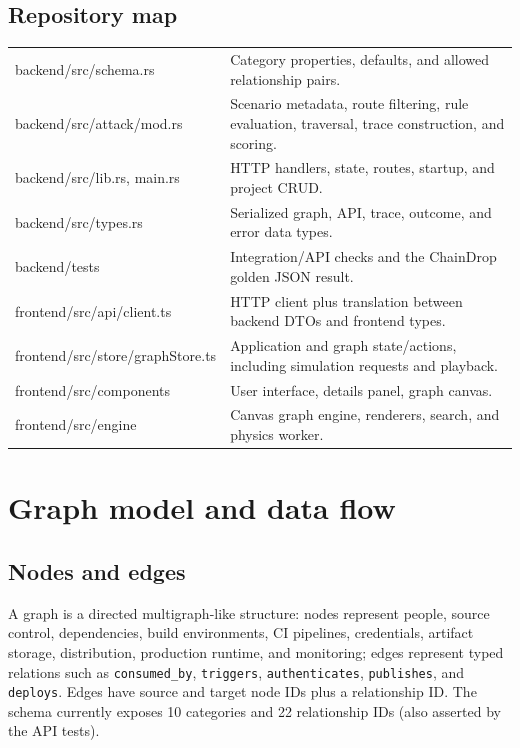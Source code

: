 \documentclass[11pt,oneside]{book}
\newcommand{\code}[1]{\texttt{\small #1}}
\begin{document}
\section{Repository map}
\begin{center}\begin{tabularx}{\textwidth}{>{\ttfamily}p{} X}\toprule
backend/src/schema.rs & Category properties, defaults, and allowed relationship pairs.\\
backend/src/attack/mod.rs & Scenario metadata, route filtering, rule evaluation, traversal, trace construction, and scoring.\\
backend/src/lib.rs, main.rs & HTTP handlers, state, routes, startup, and project CRUD.\\
backend/src/types.rs & Serialized graph, API, trace, outcome, and error data types.\\
backend/tests & Integration/API checks and the ChainDrop golden JSON result.\\
frontend/src/api/client.ts & HTTP client plus translation between backend DTOs and frontend types.\\
frontend/src/store/graphStore.ts & Application and graph state/actions, including simulation requests and playback.\\
frontend/src/components & User interface, details panel, graph canvas.\\
frontend/src/engine & Canvas graph engine, renderers, search, and physics worker.\\
\bottomrule\end{tabularx}\end{center}

\chapter{Graph model and data flow}
\section{Nodes and edges}
A graph is a directed multigraph-like structure: nodes represent people, source control, dependencies, build environments, CI pipelines, credentials, artifact storage, distribution, production runtime, and monitoring; edges represent typed relations such as \code{consumed\_by}, \code{triggers}, \code{authenticates}, \code{publishes}, and \code{deploys}. Edges have source and target node IDs plus a relationship ID. The schema currently exposes 10 categories and 22 relationship IDs (also asserted by the API tests).
\end{document}
